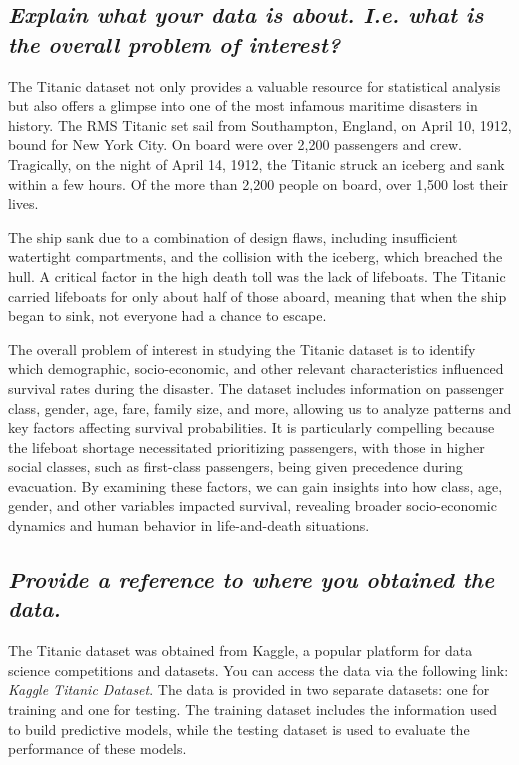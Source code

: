 \documentclass[twoside,11pt]{article}
\makeatletter
\let\@oldsubsection\subsection
\renewcommand\subsection[1]{\@oldsubsection*{\textit{#1}}}
\makeatother
\begin{document}
\subsection{Explain what your data is about. I.e. what is the overall problem of interest?}

The Titanic dataset not only provides a valuable resource for statistical analysis but also offers a glimpse into one of the most infamous maritime disasters in history. The RMS Titanic set sail from Southampton, England, on April 10, 1912, bound for New York City. On board were over 2,200 passengers and crew. Tragically, on the night of April 14, 1912, the Titanic struck an iceberg and sank within a few hours. Of the more than 2,200 people on board, over 1,500 lost their lives.

The ship sank due to a combination of design flaws, including insufficient watertight compartments, and the collision with the iceberg, which breached the hull. A critical factor in the high death toll was the lack of lifeboats. The Titanic carried lifeboats for only about half of those aboard, meaning that when the ship began to sink, not everyone had a chance to escape.

The overall problem of interest in studying the Titanic dataset is to identify which demographic, socio-economic, and other relevant characteristics influenced survival rates during the disaster. The dataset includes information on passenger class, gender, age, fare, family size, and more, allowing us to analyze patterns and key factors affecting survival probabilities. It is particularly compelling because the lifeboat shortage necessitated prioritizing passengers, with those in higher social classes, such as first-class passengers, being given precedence during evacuation. By examining these factors, we can gain insights into how class, age, gender, and other variables impacted survival, revealing broader socio-economic dynamics and human behavior in life-and-death situations.

\subsection{Provide a reference to where you obtained the data.}

The Titanic dataset was obtained from Kaggle, a popular platform for data science competitions and datasets. You can access the data via the following link: \textit{Kaggle Titanic Dataset}. The data is provided in two separate datasets: one for training and one for testing. The training dataset includes the information used to build predictive models, while the testing dataset is used to evaluate the performance of these models.
\end{document}
